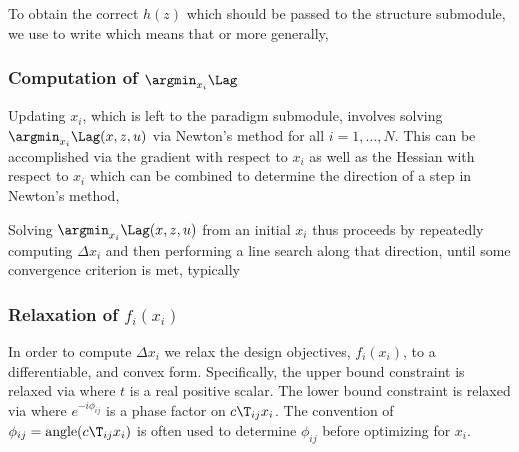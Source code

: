 \documentclass{book}
\begin{document}
To obtain the correct $h(z)$ which should be passed to the structure submodule,
    we use  to write
    which means that
    or more generally,


\subsubsection{Computation of $\argmin_{x_i} \Lag$}
Updating $x_i$, which is left to the paradigm submodule,
    involves solving $\argmin_{x_i} \Lag(x, z, u)$ via Newton's method for all $i = 1, \ldots, N$.
This can be accomplished via the gradient with respect to $x_i$
    as well as the Hessian with respect to $x_i$
    which can be combined to determine the direction of a step in Newton's method,

Solving $\argmin_{x_i} \Lag(x, z, u)$ from an initial $x_i$ thus proceeds by
    repeatedly computing $\Delta x_i$ and then performing a line search along that direction,
    until some convergence criterion is met, typically

\subsubsection{Relaxation of $f_i(x_i)$}
In order to compute $\Delta x_i$ we relax the design objectives, $f_i(x_i)$, to a differentiable, and convex form.
Specifically, the upper bound constraint is relaxed via
    where $t$ is a real positive scalar. The lower bound constraint is relaxed via
     where $e^{-i\phi_{ij}}$ is a phase factor on $c\T_{ij} x_i$.
The convention of $\phi_{ij} = \text{angle}(c\T_{ij} x_i)$ is often used
    to determine $\phi_{ij}$ before optimizing for $x_i$.
\end{document}
